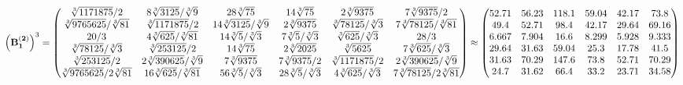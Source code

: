 \documentclass[10pt,a4paper]{article}
\begin{document}
	\[
		\left(\bold{B_1^{(2)}}\right)^{3} = 
		\begin{pmatrix}
			{\sqrt[3]{1171875}} / {{2}} & {{8}\sqrt[3]{3125}} / {\sqrt[3]{9}} & {{28}\sqrt[3]{75}}{} & {{14}\sqrt[3]{75}}{} & {{2}\sqrt[3]{9375}}{} & {{7}\sqrt[3]{9375}} / {{2}} \\
			{\sqrt[3]{9765625}} / {\sqrt[3]{81}} & {\sqrt[3]{1171875}} / {{2}} & {{14}\sqrt[3]{3125}} / {\sqrt[3]{9}} & {{2}\sqrt[3]{9375}}{} & {\sqrt[3]{78125}} / {\sqrt[3]{3}} & {{7}\sqrt[3]{78125}} / {\sqrt[3]{81}} \\
			{{20}} / {{3}} & {{4}\sqrt[3]{625}} / {\sqrt[3]{81}} & {{14}\sqrt[3]{5}} / {\sqrt[3]{3}} & {{7}\sqrt[3]{5}} / {\sqrt[3]{3}} & {\sqrt[3]{625}} / {\sqrt[3]{3}} & {{28}} / {{3}} \\
			{\sqrt[3]{78125}} / {\sqrt[3]{3}} & {\sqrt[3]{253125}} / {{2}} & {{14}\sqrt[3]{75}}{} & {{2}\sqrt[3]{2025}}{} & {\sqrt[3]{5625}}{} & {{7}\sqrt[3]{625}} / {\sqrt[3]{3}} \\
			{\sqrt[3]{253125}} / {{2}} & {{2}\sqrt[3]{390625}} / {\sqrt[3]{9}} & {{7}\sqrt[3]{9375}}{} & {{7}\sqrt[3]{9375}} / {{2}} & {\sqrt[3]{1171875}} / {{2}} & {{2}\sqrt[3]{390625}} / {\sqrt[3]{9}} \\
			{\sqrt[3]{9765625}} / {{2}\sqrt[3]{81}} & {{16}\sqrt[3]{625}} / {\sqrt[3]{81}} & {{56}\sqrt[3]{5}} / {\sqrt[3]{3}} & {{28}\sqrt[3]{5}} / {\sqrt[3]{3}} & {{4}\sqrt[3]{625}} / {\sqrt[3]{3}} & {{7}\sqrt[3]{78125}} / {{2}\sqrt[3]{81}} \\
		\end{pmatrix}
		\approx
		\begin{pmatrix}
			52.71    & 56.23    & 118.1    & 59.04    & 42.17    & 73.8     \\
			49.4     & 52.71    & 98.4     & 42.17    & 29.64    & 69.16    \\
			6.667    & 7.904    & 16.6     & 8.299    & 5.928    & 9.333    \\
			29.64    & 31.63    & 59.04    & 25.3     & 17.78    & 41.5     \\
			31.63    & 70.29    & 147.6    & 73.8     & 52.71    & 70.29    \\
			24.7     & 31.62    & 66.4     & 33.2     & 23.71    & 34.58    \\
		\end{pmatrix}
	\]
\end{document}
